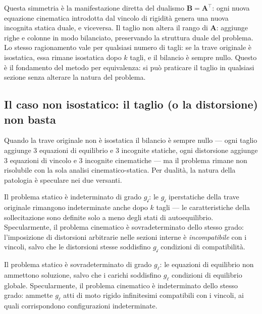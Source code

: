 \begin{oss}
	Questa simmetria è la manifestazione diretta del
	dualismo $\bm{B} = \bm{A}^{\top}$: ogni nuova equazione
	cinematica introdotta dal vincolo di rigidità genera
	una nuova incognita statica duale, e viceversa. Il
	taglio non altera il rango di $\bm{A}$: aggiunge
	righe e colonne in modo bilanciato, preservando la
	struttura duale del problema. Lo stesso ragionamento
	vale per qualsiasi numero di tagli: se la trave
	originale è isostatica, essa rimane isostatica dopo
	$k$ tagli, e il bilancio è sempre nullo. Questo è
	il fondamento del metodo per equivalenza: si può
	praticare il taglio in qualsiasi sezione senza
	alterare la natura del problema.
\end{oss}

\subsection{Il caso non isostatico: il taglio (o la	distorsione) non basta}
\label{sec:taglio_iperstatica}

Quando la trave originale non è isostatica il bilancio
è sempre nullo --- ogni taglio aggiunge $3$ equazioni
di equilibrio e $3$ incognite statiche, ogni distorsione
aggiunge $3$ equazioni di vincolo e $3$ incognite
cinematiche --- ma il problema rimane non risolubile
con la sola analisi cinematico-statica. Per dualità, la
natura della patologia è speculare nei due versanti.

Il problema statico è indeterminato di grado
$g_{\mathscr{i}}$: le $g_{\mathscr{i}}$ iperstatiche
della trave originale rimangono indeterminate anche
dopo $k$ tagli --- le caratteristiche della
sollecitazione sono definite solo a meno degli stati
di autoequilibrio. Specularmente, il problema cinematico
è sovradeterminato dello stesso grado: l'imposizione di
distorsioni arbitrarie nelle sezioni interne è
\emph{incompatibile} con i vincoli, salvo che le
distorsioni stesse soddisfino $g_{\mathscr{i}}$
condizioni di compatibilità.

Il problema statico è sovradeterminato di grado
$g_\ell$: le equazioni di equilibrio non ammettono
soluzione, salvo che i carichi soddisfino $g_\ell$
condizioni di equilibrio globale. Specularmente, il
problema cinematico è indeterminato dello stesso grado:
ammette $g_\ell$ atti di moto rigido infinitesimi
compatibili con i vincoli, ai quali corrispondono
configurazioni indeterminate.

